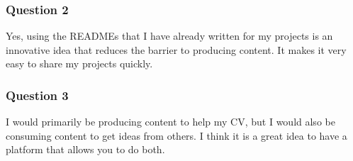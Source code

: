 \subsubsection{Question 2}
Yes, using the READMEs that I have already written for my projects is an innovative idea that reduces the barrier to producing content. It makes it very easy to share my projects quickly.

\subsubsection{Question 3}
I would primarily be producing content to help my CV, but I would also be consuming content to get ideas from others. I think it is a great idea to have a platform that allows you to do both.

